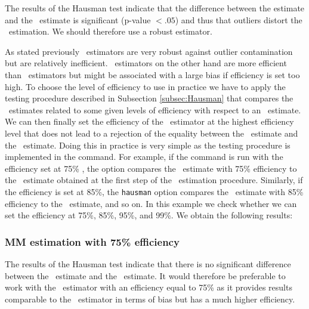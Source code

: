 \begin{stlog}

\end{stlog}

The results of the Hausman test indicate that the difference between the
 estimate and the ~estimate is significant (p-value $<
.05$) and thus that outliers distort the ~estimation. We should
therefore use a robust estimator.


As stated previously ~estimators are very robust against outlier
contamination but are relatively inefficient. ~estimators on the other
hand are more efficient than ~estimators but might be associated with a
large bias if efficiency is set too high. To choose the level of efficiency to
use in practice we have to apply the testing procedure described in Subsection
\ref{subsec:Hausman} that compares the ~estimates related to some
given levels of efficiency with respect to an ~estimate. We can then
finally set the efficiency of the ~estimator at the highest efficiency
level that does not lead to a rejection of the equality between the 
~estimate and the ~estimate. Doing this in practice is very simple as
the testing procedure is implemented in the  command. For
example, if the  command is run with the efficiency set at
75\% , the  option compares the ~estimate with 75\%
efficiency to the ~estimate obtained at the first step of the 
~estimation procedure. Similarly, if the efficiency is set at 85\%, the
\texttt{hausman} option compares the ~estimate with 85\% efficiency to
the ~estimate, and so on. In this example we check whether we can set
the efficiency at 75\%, 85\%, 95\%, and 99\%. We obtain the following results:

\subsubsection{MM estimation with 75\% efficiency}

\begin{stlog}

\end{stlog}

The results of the Hausman test indicate that there is no significant
difference between the ~estimate and the ~estimate. It would
therefore be preferable to work with the ~estimator with an efficiency
equal to 75\% as it provides results comparable to the ~estimator in
terms of bias but has a much higher efficiency.

